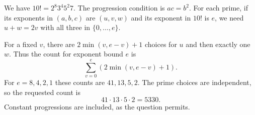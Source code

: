 We have $10!=2^8 3^4 5^2 7$. The progression condition is $ac=b^2$. For each prime, if its exponents in $(a,b,c)$ are $(u,v,w)$ and its exponent in $10!$ is $e$, we need $u+w=2v$ with all three in $\{0,\ldots,e\}$.

For a fixed $v$, there are $2\min(v,e-v)+1$ choices for $u$ and then exactly one $w$. Thus the count for exponent bound $e$ is
\[
\sum_{v=0}^e(2\min(v,e-v)+1).
\]
For $e=8,4,2,1$ these counts are $41,13,5,2$. The prime choices are independent, so the requested count is
\[
\boxed{41\cdot13\cdot5\cdot2=5330}.
\]
Constant progressions are included, as the question permits.
